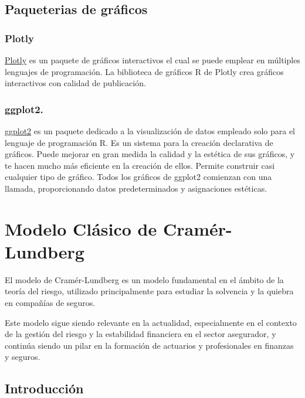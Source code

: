 \documentclass[
  us-letterpaper,
]{scrreprt}
\theoremstyle{plain}
\theoremstyle{plain}
\theoremstyle{definition}
\theoremstyle{remark}
\begin{document}
\section{Paqueterias de gráficos}\label{paqueterias-de-gruxe1ficos}

\subsection{Plotly}\label{sec-plotly}

\href{https://plotly.com/graphing-libraries/}{Plotly} es un paquete de
gráficos interactivos el cual se puede emplear en múltiples lenguajes de
programación. La biblioteca de gráficos R de Plotly crea gráficos
interactivos con calidad de publicación.

\subsection{ggplot2.}\label{sec-ggplot2}

\href{https://ggplot2.tidyverse.org/}{ggplot2} es un paquete dedicado a
la visualización de datos empleado solo para el lenguaje de programación
R. Es un sistema para la creación declarativa de gráficos. Puede mejorar
en gran medida la calidad y la estética de sus gráficos, y te hacen
mucho más eficiente en la creación de ellos. Permite construir casi
cualquier tipo de gráfico. Todos los gráficos de ggplot2 comienzan con
una llamada, proporcionando datos predeterminados y asignaciones
estéticas.


\chapter{Modelo Clásico de Cramér-Lundberg}\label{sec-modelo_C_L}

El modelo de Cramér-Lundberg es un modelo fundamental en el ámbito de la
teoría del riesgo, utilizado principalmente para estudiar la solvencia y
la quiebra en compañías de seguros.

Este modelo sigue siendo relevante en la actualidad, especialmente en el
contexto de la gestión del riesgo y la estabilidad financiera en el
sector asegurador, y continúa siendo un pilar en la formación de
actuarios y profesionales en finanzas y seguros.

\section{Introducción}\label{introducciuxf3n-1}
\end{document}
